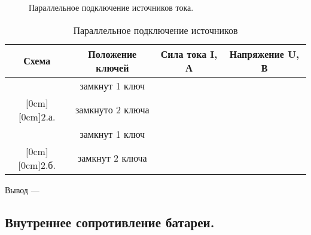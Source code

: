 \begin{figure}[h]
\begin{minipage}[h]{0.5\linewidth}
\end{minipage}
\hfill
\begin{minipage}[h]{0.5\linewidth}
\end{minipage}
\caption{Параллельное подключение источников тока.}
\label{ris:parallel}
\end{figure}

\begin{table}[h]
 \caption{Параллельное подключение источников}
    \centering
    \begin{tabular}{|c|c|c|c|}
        \hline
         Схема& Положение ключей & {Сила тока I, А} & {Напряжение U, В} \\
        \hline  
       & замкнут 1 ключ  &   &   \\
        \cline{2-4}
        \raisebox{1.5ex}[0cm][0cm]{2.а.} 
        &замкнуто 2 ключа  &   &   \\
        \hline
         & замкнут 1 ключ  &   &   \\
        \cline{2-4}
        \raisebox{1.5ex}[0cm][0cm]{2.б.}
        &замкнут 2 ключа  &   &   \\
        \hline
    \end{tabular}
    \label{tab:1.2}
\end{table}

Вывод --- \hrulefill 

\hrulefill 

\hrulefill

\subsection{Внутреннее сопротивление батареи.}

